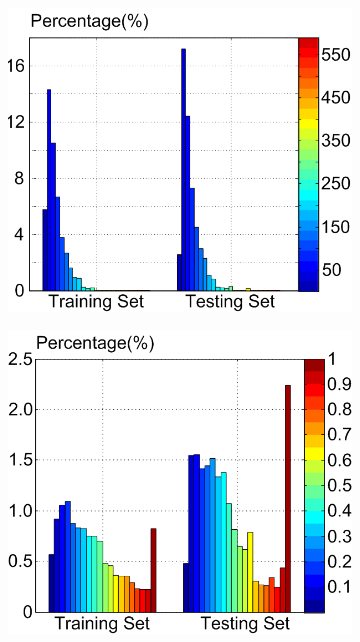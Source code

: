 \begin{figure}[t]
\begin{subfigure}[b]{\uadetracfigsize\textwidth}
        \caption[]{}
    \end{subfigure}
    \hfill
    \begin{subfigure}[b]{\uadetracfigsize\textwidth}
        \centering
        \includegraphics[width=\textwidth]{figures/datasets/uadetrac_stats_scale.png}
        \caption[]{}
    \end{subfigure}
    \hfill
    \begin{subfigure}[b]{\uadetracfigsize\textwidth}
        \centering
        \includegraphics[width=\textwidth]{figures/datasets/uadetrac_stats_occlusion_ratio.png}

\end{subfigure}
\end{figure}
